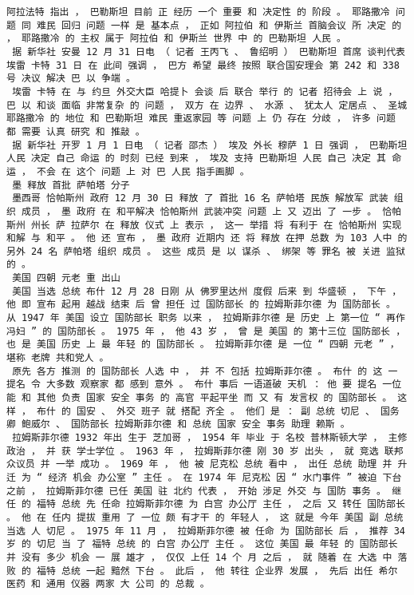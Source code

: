 \documentclass{article}
\begin{document}
\begin{Verbatim}[commandchars=\\\{\}]
 阿拉法特 指出 ， 巴勒斯坦 目前 正 经历 一个 重要 和 决定性 的 阶段 。 耶路撒冷 问题 同 难民 回归 问题 一样 是 基本点 ， 正如 阿拉伯 和 伊斯兰 首脑会议 所 决定 的 ， 耶路撒冷 的 主权 属于 阿拉伯 和 伊斯兰 世界 中 的 巴勒斯坦 人民 。 
 据 新华社 安曼 12 月 31 日电 （ 记者 王丙飞 、 鲁绍明 ） 巴勒斯坦 首席 谈判代表 埃雷 卡特 31 日 在 此间 强调 ， 巴方 希望 最终 按照 联合国安理会 第 242 和 338 号 决议 解决 巴 以 争端 。 
 埃雷 卡特 在 与 约旦 外交大臣 哈提卜 会谈 后 联合 举行 的 记者 招待会 上 说 ， 巴 以 和谈 面临 非常复杂 的 问题 ， 双方 在 边界 、 水源 、 犹太人 定居点 、 圣城 耶路撒冷 的 地位 和 巴勒斯坦 难民 重返家园 等 问题 上 仍 存在 分歧 ， 许多 问题 都 需要 认真 研究 和 推敲 。 
 据 新华社 开罗 1 月 1 日电 （ 记者 邵杰 ） 埃及 外长 穆萨 1 日 强调 ， 巴勒斯坦 人民 决定 自己 命运 的 时刻 已经 到来 ， 埃及 支持 巴勒斯坦 人民 自己 决定 其 命运 ， 不会 在 这个 问题 上 对 巴 人民 指手画脚 。 
 墨 释放 首批 萨帕塔 分子 
 墨西哥 恰帕斯州 政府 12 月 30 日 释放 了 首批 16 名 萨帕塔 民族 解放军 武装 组织 成员 ， 墨 政府 在 和平解决 恰帕斯州 武装冲突 问题 上 又 迈出 了 一步 。 恰帕斯州 州长 萨 拉萨尔 在 释放 仪式 上 表示 ， 这一 举措 将 有利于 在 恰帕斯州 实现 和解 与 和平 。 他 还 宣布 ， 墨 政府 近期内 还 将 释放 在押 总数 为 103 人中 的 另外 24 名 萨帕塔 组织 成员 。 这些 成员 是 以 谋杀 、 绑架 等 罪名 被 关进 监狱 的 。 
 美国 四朝 元老 重 出山 
 美国 当选 总统 布什 12 月 28 日刚 从 佛罗里达州 度假 后来 到 华盛顿 ， 下午 ， 他 即 宣布 起用 越战 结束 后 曾 担任 过 国防部长 的 拉姆斯菲尔德 为 国防部长 。 从 1947 年 美国 设立 国防部长 职务 以来 ， 拉姆斯菲尔德 是 历史 上 第一位 “ 再作冯妇 ” 的 国防部长 。 1975 年 ， 他 43 岁 ， 曾 是 美国 的 第十三位 国防部长 ， 也 是 美国 历史 上 最 年轻 的 国防部长 。 拉姆斯菲尔德 是 一位 “ 四朝 元老 ” ， 堪称 老牌 共和党人 。 
 原先 各方 推测 的 国防部长 人选 中 ， 并 不 包括 拉姆斯菲尔德 。 布什 的 这 一 提名 令 大多数 观察家 都 感到 意外 。 布什 事后 一语道破 天机 ： 他 要 提名 一位 能 和 其他 负责 国家 安全 事务 的 高官 平起平坐 而 又 有 发言权 的 国防部长 。 这样 ， 布什 的 国安 、 外交 班子 就 搭配 齐全 。 他们 是 ： 副 总统 切尼 、 国务卿 鲍威尔 、 国防部长 拉姆斯菲尔德 和 总统 国家 安全 事务 助理 赖斯 。 
 拉姆斯菲尔德 1932 年出 生于 芝加哥 ， 1954 年 毕业 于 名校 普林斯顿大学 ， 主修 政治 ， 并 获 学士学位 。 1963 年 ， 拉姆斯菲尔德 刚 30 岁 出头 ， 就 竞选 联邦 众议员 并 一举 成功 。 1969 年 ， 他 被 尼克松 总统 看中 ， 出任 总统 助理 并 升迁 为 “ 经济 机会 办公室 ” 主任 。 在 1974 年 尼克松 因 “ 水门事件 ” 被迫 下台 之前 ， 拉姆斯菲尔德 已任 美国 驻 北约 代表 ， 开始 涉足 外交 与 国防 事务 。 继任 的 福特 总统 先 任命 拉姆斯菲尔德 为 白宫 办公厅 主任 ， 之后 又 转任 国防部长 。 他 在 任内 提拔 重用 了 一位 颇 有才干 的 年轻人 ， 这 就是 今年 美国 副 总统 当选 人 切尼 。 1975 年 11 月 ， 拉姆斯菲尔德 被 任命 为 国防部长 后 ， 推荐 34 岁 的 切尼 当 了 福特 总统 的 白宫 办公厅 主任 。 这位 美国 最 年轻 的 国防部长 并 没有 多少 机会 一 展 雄才 ， 仅仅 上任 14 个 月 之后 ， 就 随着 在 大选 中 落败 的 福特 总统 一起 黯然 下台 。 此后 ， 他 转往 企业界 发展 ， 先后 出任 希尔 医药 和 通用 仪器 两家 大 公司 的 总裁 。 

\end{Verbatim}
\end{document}
